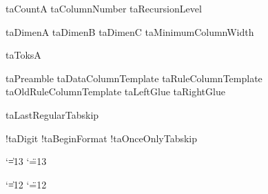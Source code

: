 \newcount\!taCountA
\newcount\!taColumnNumber
\newcount\!taRecursionLevel %

\newdimen\!taDimenA  %
\newdimen\!taDimenB  %
\newdimen\!taDimenC  %
\newdimen\!taMinimumColumnWidth

\newtoks\!taToksA

\newtoks\!taPreamble
\newtoks\!taDataColumnTemplate
\newtoks\!taRuleColumnTemplate
\newtoks\!taOldRuleColumnTemplate
\newtoks\!taLeftGlue
\newtoks\!taRightGlue

\newskip\!taLastRegularTabskip

\newif\if!taDigit
\newif\if!taBeginFormat
\newif\if!taOnceOnlyTabskip




\def\TaBlE{%
  T\kern-.27em\lower.5ex\hbox{A}\kern-.18em B\kern-.1em
    \lower.5ex\hbox{L}\kern-.075em E}




{\catcode`\|=13 \catcode`\"=13
  \gdef\ActivateBarAndQuote{%
    \ifnum \catcode`\|=13
    \else
      \catcode`\|=13
      \def|{%
        \ifmmode
          \vert
        \else
          \char`\|
        \fi}%
    \fi
    \ifnum \catcode`\"=13
    \else
      \catcode`\"=13
      \def"{\char`\"}%
    \fi}}
 
{\catcode `\|=12 \catcode `\"=12 
\gdef\VBar{|}
\gdef\DQuote{"}}



\def\!thMessage#1{\immediate\write16{#1}\ignorespaces}
 
